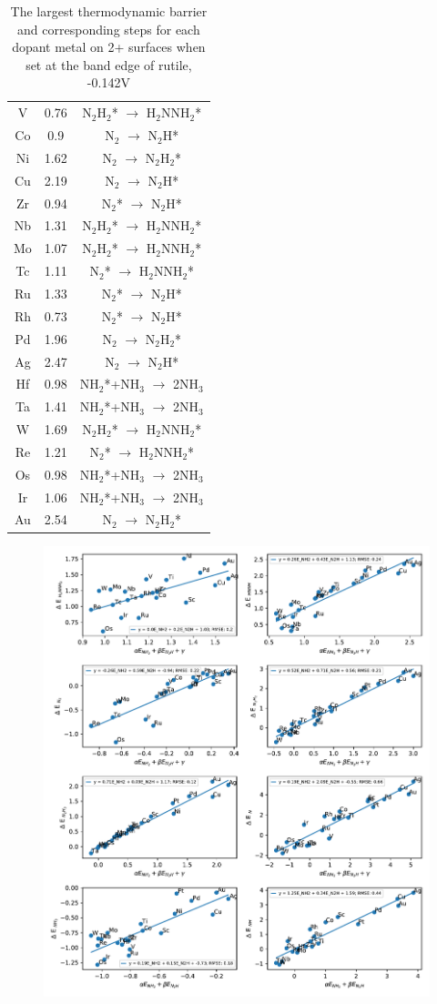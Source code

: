 \documentclass[journal=jacsat,manuscript=article]{achemso}
\begin{document}
\begin{table}
\begin{center}
\begin{tabular}{| c | c |c |}
V & 0.76 & N$_2$H$_2$* $\rightarrow$ H$_2$NNH$_2$*\\
Co & 0.9 & N$_2$ $\rightarrow$ N$_2$H*\\
Ni & 1.62 & N$_2$ $\rightarrow$ N$_2$H$_2$*\\
Cu & 2.19 & N$_2$ $\rightarrow$ N$_2$H*\\
Zr & 0.94 & N$_2$* $\rightarrow$ N$_2$H*\\
Nb & 1.31 & N$_2$H$_2$* $\rightarrow$ H$_2$NNH$_2$*\\
Mo & 1.07 & N$_2$H$_2$* $\rightarrow$ H$_2$NNH$_2$*\\
Tc & 1.11 & N$_2$* $\rightarrow$ H$_2$NNH$_2$*\\
Ru & 1.33 & N$_2$* $\rightarrow$ N$_2$H*\\
Rh & 0.73 & N$_2$* $\rightarrow$ N$_2$H*\\
Pd & 1.96 & N$_2$ $\rightarrow$ N$_2$H$_2$*\\
Ag & 2.47 & N$_2$ $\rightarrow$ N$_2$H*\\
Hf & 0.98 & NH$_2$*+NH$_3$ $\rightarrow$ 2NH$_3$\\
Ta & 1.41 & NH$_2$*+NH$_3$ $\rightarrow$ 2NH$_3$\\
W & 1.69 & N$_2$H$_2$* $\rightarrow$ H$_2$NNH$_2$*\\
Re & 1.21 & N$_2$* $\rightarrow$ H$_2$NNH$_2$*\\
Os & 0.98 & NH$_2$*+NH$_3$ $\rightarrow$ 2NH$_3$\\
Ir & 1.06 & NH$_2$*+NH$_3$ $\rightarrow$ 2NH$_3$\\
Au & 2.54 & N$_2$ $\rightarrow$ N$_2$H$_2$*\\
\hline
\end{tabular}
\end{center}
\caption{The largest thermodynamic barrier and corresponding steps for each dopant metal on 2+ surfaces when set at the band edge of rutile, -0.142V}\label{table:rate_limiting_steps}\end{table}\begin{figure}
\centering
\includegraphics[width=0.8\linewidth]{Images/scaling_species.pdf}

\end{figure}
\end{document}
